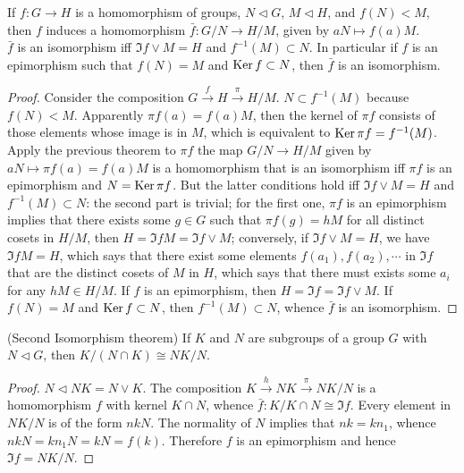 \begin{Corollary}
	If $ f:G \to H $ is a homomorphism of groups, $ N \vartriangleleft G $, $ M \vartriangleleft H $, and $ f(N)<M $, then $ f $ induces a homomorphism $ \bar{f}:G/N \to H/M $, given by $ aN \mapsto f(a)M $.\\
	$ \bar{f} $ is an isomorphism iff $ \Im f \vee M = H$ and $ f^{-1}(M)\subset N $. In particular if $ f $ is an epimorphism such that $ f(N)=M $ and $ \operatorname{Ker} f \subset N $, then $ \bar{f} $ is an isomorphism.
\end{Corollary}
\begin{proof}
	Consider the composition $ G \overset{f}{\to} H \overset{\pi}{\to}H/M$. $ N \subset f^{-1}(M) $ because $ f(N)<M $. Apparently $ \pi f(a) = f(a)M $, then the kernel of $ \pi f $ consists of those elements whose image is in $ M $, which is equivalent to $ \operatorname{Ker} \pi f = f^{-1}(M) $. Apply the previous theorem to $ \pi f $ the map $ G/N \to H/M $ given by $ aN \mapsto \pi f(a)=f(a)M $ is a homomorphism that is an isomorphism iff $ \pi f $ is an epimorphism and $ N = \operatorname{Ker} \pi f $. But the latter conditions hold iff $ \Im f \vee M = H $ and $ f^{-1}(M)\subset N $: the second part is trivial; for the first one, $ \pi f $ is an epimorphism implies that there exists some $ g \in G $ such that $ \pi f(g)=hM $ for all distinct cosets in $ H/M $, then $ H = \Im f M = \Im f \vee M $; conversely, if $ \Im f \vee M = H $, we have $ \Im f M =H $, which says that there exist some elements $ f(a_1),f(a_2),\cdots $ in $ \Im f $ that are the distinct cosets of $ M $ in $ H $, which says that there must exists some $ a_i $ for any $ hM \in H/M $. If $ f $ is an epimorphism, then $ H = \Im f = \Im f \vee M $. If $ f(N )=M $ and $ \operatorname{Ker} f \subset N $, then $ f^{-1}(M)\subset N $, whence $ \bar{f} $ is an isomorphism.
\end{proof}
\begin{Corollary}(Second Isomorphism theorem)
	If $ K $ and $ N $ are subgroups of a group $ G $ with $ N \vartriangleleft G $, then $ K/(N \cap K)\cong NK/N $.
\end{Corollary}
\begin{proof}
	$ N \vartriangleleft NK = N \vee K $. The composition $ K \overset{h}{\to}NK \overset{\pi}{\to} NK/N $ is a homomorphism $ f $ with kernel $ K \cap N $, whence $ \bar{f}:K/K\cap N \cong \Im f $. Every element in $ NK/N $ is of the form $ nkN $. The normality of $ N $ implies that $ nk=kn_1 $, whence $ nkN = kn_1N=kN=f(k) $. Therefore $ f $ is an epimorphism and hence $ \Im f = NK/N $.
\end{proof}
